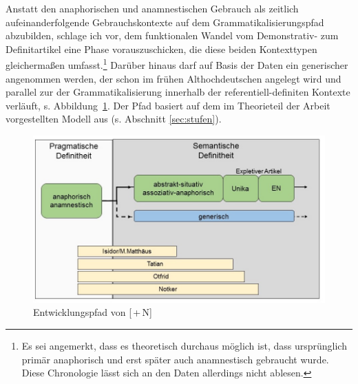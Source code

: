 Anstatt den anaphorischen und anamnestischen Gebrauch als zeitlich aufeinanderfolgende Gebrauchskontexte  auf dem Grammatikalisierungspfad abzubilden, schlage ich vor, dem funktionalen Wandel vom Demonstrativ- zum Definitartikel eine Phase vorauszuschicken, die diese beiden Kontexttypen gleichermaßen umfasst.\footnote{Es sei angemerkt, dass es theoretisch durchaus möglich ist, dass  ursprünglich primär anaphorisch und erst später auch anamnestisch gebraucht wurde. Diese Chronologie lässt sich an den Daten allerdings nicht ablesen.} Darüber hinaus darf auf Basis der Daten ein generischer  angenommen werden, der schon im frühen Althochdeutschen angelegt wird und parallel zur  der Grammatikalisierung innerhalb der referentiell-definiten Kontexte verläuft, s. Abbildung~\ref{abb:expansion-definitheit}. Der Pfad basiert auf dem im Theorieteil der Arbeit vorgestellten Modell aus \textcite{Schmuck2014} (s. Abschnitt \ref{sec:stufen}). 

 
\begin{figure}
\begin{center}
  \includegraphics[width=\textwidth]{images/diskussion-generisch-farbe-neu.jpg}
\caption {Entwicklungspfad von [\,+\,N]} 
\label{abb:expansion-definitheit}
\end{center}
\end{figure} 
 
